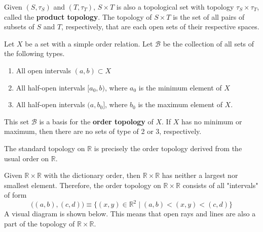 \documentclass{article}
\begin{document}
    \begin{definition}
    Given $(S, \tau_{S})$ and $(T, \tau_{T})$, $S \times T$ is also a topological set with topology $\tau_S \times \tau_{T}$, called the \textbf{product topology}. The topology of $S \times T$ is the set of all pairs of subsets of $S$ and $T$, respectively, that are each open sets of their respective spaces. 
    \end{definition}

    \begin{definition}
    Let $X$ be a set with a simple order relation. Let $\mathscr{B}$ be the collection of all sets of the following types. 
    \begin{enumerate}
        \item All open intervals $(a, b) \subset X$
        \item All half-open intervals $[a_0, b)$, where $a_0$ is the minimum element of $X$
        \item All half-open intervals $(a, b_0]$, where $b_0$ is the maximum element of $X$. 
    \end{enumerate}
    This set $\mathscr{B}$ is a basis for the \textbf{order topology} of $X$. If $X$ has no minimum or maximum, then there are no sets of type of 2 or 3, respectively. 
    \end{definition}

    \begin{example}
    The standard topology on $\mathbb{R}$ is precisely the order topology derived from the usual order on $\mathbb{R}$. 
    \end{example}

    \begin{example}
    Given $\mathbb{R} \times \mathbb{R}$ with the dictionary order, then $\mathbb{R} \times \mathbb{R}$ has neither a largest nor smallest element. Therefore, the order topology on $\mathbb{R} \times \mathbb{R}$ consists of all "intervals" of form
    \[\big((a, b), (c, d) \big) \equiv  \{(x, y) \in \mathbb{R}^2 \; | \; (a, b) < (x, y) < (c, d)\}\]
    A visual diagram is shown below. This means that open rays and lines are also a part of the topology of $\mathbb{R} \times \mathbb{R}$. 

    \begin{center}
    \end{center}
    \end{example}
\end{document}
